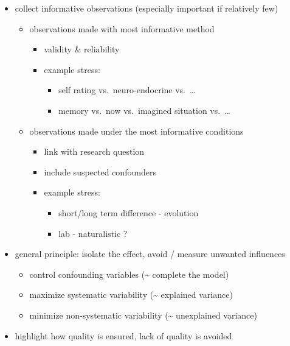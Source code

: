 \documentclass[
]{article}
\providecommand{\tightlist}{%
  \setlength{\itemsep}{0pt}\setlength{\parskip}{0pt}}
\begin{document}
\begin{itemize}
\tightlist
\item
  collect informative observations (especially important if relatively
  few)

  \begin{itemize}
  \tightlist
  \item
    observations made with most informative method

    \begin{itemize}
    \tightlist
    \item
      validity \& reliability
    \item
      example stress:

      \begin{itemize}
      \tightlist
      \item
        self rating vs.~neuro-endocrine vs.~\ldots{}
      \item
        memory vs.~now vs.~imagined situation vs.~\ldots{}
      \end{itemize}
    \end{itemize}
  \item
    observations made under the most informative conditions

    \begin{itemize}
    \tightlist
    \item
      link with research question
    \item
      include suspected confounders
    \item
      example stress:

      \begin{itemize}
      \tightlist
      \item
        short/long term difference - evolution
      \item
        lab - naturalistic ? \\
      \end{itemize}
    \end{itemize}
  \end{itemize}
\item
  general principle: isolate the effect, avoid / measure unwanted
  influences

  \begin{itemize}
  \tightlist
  \item
    control confounding variables (\textasciitilde{} complete the model)
  \item
    maximize systematic variability (\textasciitilde{} explained
    variance)
  \item
    minimize non-systematic variability (\textasciitilde{} unexplained
    variance) \\
  \end{itemize}
\item
  highlight how quality is ensured, lack of quality is avoided


\end{itemize}
\end{document}

